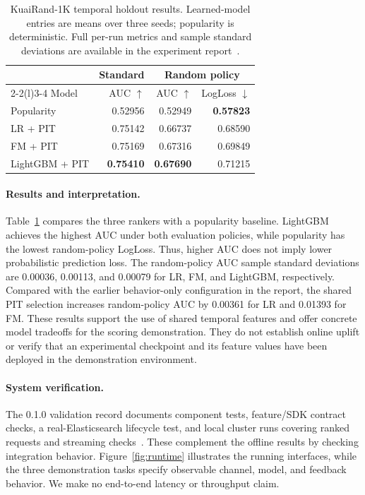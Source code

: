 \documentclass[sigconf,screen,review]{acmart}
\begin{document}
\begin{table}[t]
\caption{KuaiRand-1K temporal holdout results. Learned-model entries are means over three seeds; popularity is deterministic. Full per-run metrics and sample standard deviations are available in the experiment report~\cite{experiments}.}
\label{tab:kuairand}
\centering\small
\begin{tabular}{@{}lrrr@{}}
\toprule
& Standard & \multicolumn{2}{c}{Random policy}\\
\cmidrule(l){2-2}\cmidrule(l){3-4}
Model & AUC $\uparrow$ & AUC $\uparrow$ & LogLoss $\downarrow$\\
\midrule
Popularity & 0.52956 & 0.52949 & \textbf{0.57823}\\
LR + PIT & 0.75142 & 0.66737 & 0.68590\\
FM + PIT & 0.75169 & 0.67316 & 0.69849\\
LightGBM + PIT & \textbf{0.75410} & \textbf{0.67690} & 0.71215\\
\bottomrule
\end{tabular}
\end{table}

\paragraph{Results and interpretation.}
Table~\ref{tab:kuairand} compares the three rankers with a popularity baseline. LightGBM achieves the highest AUC under both evaluation policies, while popularity has the lowest random-policy LogLoss. Thus, higher AUC does not imply lower probabilistic prediction loss. The random-policy AUC sample standard deviations are 0.00036, 0.00113, and 0.00079 for LR, FM, and LightGBM, respectively. Compared with the earlier behavior-only configuration in the report, the shared PIT selection increases random-policy AUC by 0.00361 for LR and 0.01393 for FM. These results support the use of shared temporal features and offer concrete model tradeoffs for the scoring demonstration. They do not establish online uplift or verify that an experimental checkpoint and its feature values have been deployed in the demonstration environment.

\paragraph{System verification.}
The 0.1.0 validation record documents component tests, feature/SDK contract checks, a real-Elasticsearch lifecycle test, and local cluster runs covering ranked requests and streaming checks~\cite{release}. These complement the offline results by checking integration behavior. Figure~\ref{fig:runtime} illustrates the running interfaces, while the three demonstration tasks specify observable channel, model, and feedback behavior. We make no end-to-end latency or throughput claim.
\end{document}
